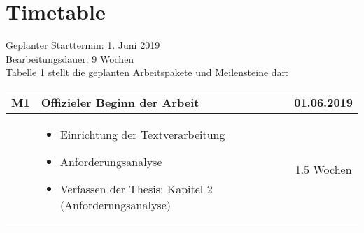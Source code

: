 \section{Timetable}
\label{sec:timetable}
Geplanter Starttermin: 1. Juni 2019 \\
Bearbeitungsdauer: 9 Wochen \\
Tabelle 1 stellt die geplanten Arbeitspakete und Meilensteine dar:
\\

	\begin{flushleft}
	    \begin{tabular}{ | l | p{10cm} | c |}
	    \hline
	    M1 & Offizieler Beginn der Arbeit & 01.06.2019 \\ 
	    \hline
	    & \begin{itemize}
            \item Einrichtung der Textverarbeitung
            \item Anforderungsanalyse
            \item Verfassen der Thesis: Kapitel 2 (Anforderungsanalyse)
	        \end{itemize} & 1.5 Wochen \\
	    \hline
	    \end{tabular}
	\end{flushleft}
